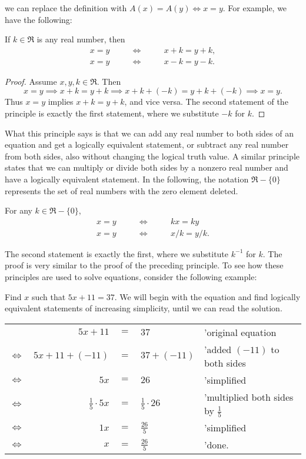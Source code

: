 we can replace the definition with $A(x)=A(y)\iff x=y$. 
For example, we have the following:
\begin{principle}
If $k\in\Re$ is any real number, then
\begin{eqnarray}x=y&\qquad\iff\qquad &x+k=y+k, \\
x=y&\qquad\iff\qquad &x-k=y-k.\end{eqnarray} 
\label{addtobothsides}\end{principle}
\begin{proof}
 Assume $x,y,k \in\Re$.  Then
$$x=y\implies x+k=y+k \implies x+k+(-k)=y+k+(-k)\implies x=y.$$
Thus $x=y$ implies $x+k=y+k$, and vice versa. The second statement
of the principle is exactly the first statement, where we substitute
$-k$ for $k$. 
\end{proof}
What this principle says is that we can add  any real number
to both
sides of an equation and get a logically equivalent statement,
or subtract any real number from both sides, also without changing
the logical truth value. 
A similar principle states that we can multiply or divide both
sides by a nonzero real number and have a logically equivalent 
statement.
In the following, the notation $\Re-\{0\}$ represents 
the set of real numbers with the zero element deleted. 
\begin{principle} \label{multiplybothsides}For any $k\in\Re-\{0\}$, 
\begin{eqnarray}x=y&\qquad\iff \qquad &kx=ky\\ 
x=y&\qquad\iff\qquad &x/k=y/k.\end{eqnarray}  
\end{principle}
The second statement is exactly the first, where we substitute
$k^{-1}$ for $k$.  The proof is very similar to the proof of the 
preceding principle.  To see how these principles are used
to solve equations, consider the following example: 

\bex
Find $x$ such that $5x+11=37.$
\eex
\noindent We will begin with the equation and find logically
equivalent statements of increasing simplicity, until we can read
the solution.

\begin{tabular}{crcll} 
&$5x+11$ & $=$ & $37$ &'original equation\\[2pt]   
$\iff$ & $5x+11+(-11)$ & $=$ & $37+(-11)$ &'added $(-11)$ to both sides\\[2pt] 
$\iff$ & $5x$ & $=$ & $26$ &'simplified\\[2pt] 
$\iff$ & $\frac15\cdot 5x$ & $=$ & $\frac15\cdot26$
	&'multiplied both sides by $\frac15$\\[2pt] 
$\iff$ & $1x$ & $=$ & $\frac{26}5$ &'simplified\\[2pt] 
$\iff$ & $x$ &$=$& $\frac{26}5$ &'done. 
\end{tabular}
 
